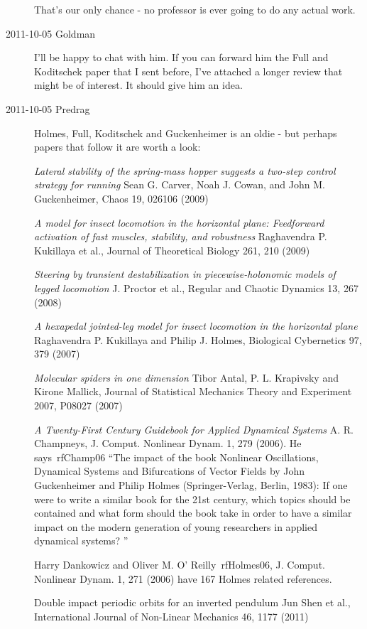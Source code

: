 \begin{description}
That's our only chance - no professor is ever going to do any
actual work.

\item[2011-10-05 Goldman]
I'll be happy to chat with him. If you can forward him the Full and
Koditschek paper that I sent before, I've attached a longer review that
might be of interest. It should give him an idea.

\item[2011-10-05 Predrag]
Holmes, Full, Koditschek and Guckenheimer is
an oldie - but perhaps papers that follow it are worth a look:

\emph{Lateral stability of the spring-mass hopper suggests a two-step control strategy for running}
    Sean G. Carver, Noah J. Cowan, and John M. Guckenheimer, Chaos 19, 026106 (2009)

\emph{A model for insect locomotion in the horizontal plane: Feedforward activation of fast muscles, stability, and robustness}
    Raghavendra P. Kukillaya et al., Journal of Theoretical Biology 261, 210 (2009)

\emph{Steering by transient destabilization in piecewise-holonomic models of legged locomotion}
    J. Proctor et al., Regular and Chaotic Dynamics 13, 267 (2008)

\emph{A hexapedal jointed-leg model for insect locomotion in the horizontal plane}
    Raghavendra P. Kukillaya and Philip J. Holmes, Biological Cybernetics 97, 379 (2007)

\emph{Molecular spiders in one dimension}
    Tibor Antal, P. L. Krapivsky and Kirone Mallick,
    Journal of Statistical Mechanics Theory and Experiment 2007, P08027 (2007)

    \emph{A Twenty-First Century Guidebook for Applied Dynamical Systems}
    A. R. Champneys, J. Comput. Nonlinear Dynam. 1, 279 (2006). He says~rf{Champ06}
``The impact of the book
Nonlinear Oscillations, Dynamical Systems and Bifurcations of Vector
Fields by John Guckenheimer and Philip Holmes
(Springer-Verlag, Berlin, 1983): If
one were to write a similar book for the 21st century, which topics
should be contained and what form should the book take in order to have a
similar impact on the modern generation of young researchers in applied
dynamical systems? ''


    Harry Dankowicz and Oliver M. O' Reilly~rf{Holmes06},
J. Comput. Nonlinear Dynam. 1, 271 (2006) have 167 Holmes related
references.

    Double impact periodic orbits for an inverted pendulum
    Jun Shen et al., International Journal of Non-Linear Mechanics 46, 1177 (2011)


\end{description}
